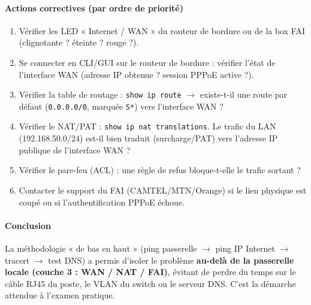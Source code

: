 \documentclass[11pt]{article}
\begin{document}
\begin{exoresolu}
\paragraph{Actions correctives (par ordre de priorité)}
\begin{enumerate}
    \item Vérifier les LED « Internet / WAN » du routeur de bordure ou de la box FAI (clignotante ? éteinte ? rouge ?).
    \item Se connecter en CLI/GUI sur le routeur de bordure : vérifier l'état de l'interface WAN (adresse IP obtenue ? session PPPoE active ?).
    \item Vérifier la table de routage : \texttt{show ip route} $\rightarrow$ existe-t-il une route par défaut (\texttt{0.0.0.0/0}, marquée \texttt{S*}) vers l'interface WAN ?
    \item Vérifier le NAT/PAT : \texttt{show ip nat translations}. Le trafic du LAN (192.168.50.0/24) est-il bien traduit (surcharge/PAT) vers l'adresse IP publique de l'interface WAN ?
    \item Vérifier le pare-feu (ACL) : une règle de refus bloque-t-elle le trafic sortant ?
    \item Contacter le support du FAI (CAMTEL/MTN/Orange) si le lien physique est coupé ou si l'authentification PPPoE échoue.
\end{enumerate}

\paragraph{Conclusion}
La méthodologie « de bas en haut » (ping passerelle $\rightarrow$ ping IP Internet $\rightarrow$ tracert $\rightarrow$ test DNS) a permis d'isoler le problème \textbf{au-delà de la passerelle locale (couche 3 : WAN / NAT / FAI)}, évitant de perdre du temps sur le câble RJ45 du poste, le VLAN du switch ou le serveur DNS. C'est la démarche attendue à l'examen pratique.
\end{exoresolu}
\end{document}
